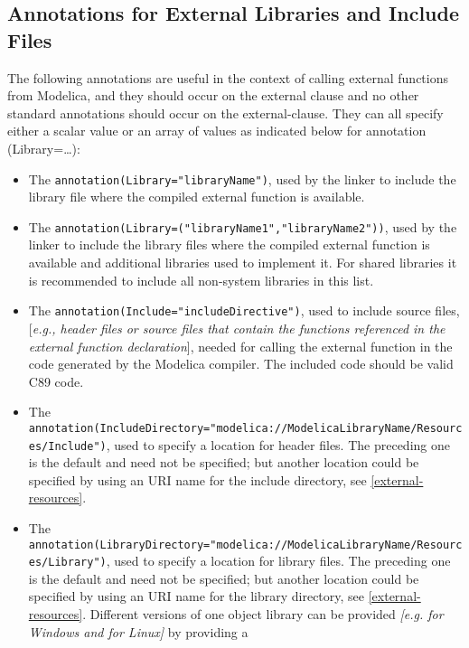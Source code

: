 \subsection{Annotations for External Libraries and Include Files}

The following annotations are useful in the context of calling external
functions from Modelica, and they should occur on the external clause
and no other standard annotations should occur on the external-clause.
They can all specify either a scalar value or an array of values as
indicated below for annotation (Library=\ldots{}):

\begin{itemize}
\item
  The \lstinline!annotation(Library="libraryName")!, used by the linker to include
  the library file where the compiled external function is available.
\item
  The \lstinline!annotation(Library=("libraryName1","libraryName2"))!, used by the
  linker to include the library files where the compiled external
  function is available and additional libraries used to implement it.
  For shared libraries it is recommended to include all non-system
  libraries in this list.
\item
  The \lstinline!annotation(Include="includeDirective")!, used to include source
  files, {[}\emph{e.g., header files or source files that contain the
  functions referenced in the external function declaration}{]}, needed
  for calling the external function in the code generated by the
  Modelica compiler. The included code should be valid C89 code.
\item
  The
  \lstinline!annotation(IncludeDirectory="modelica://ModelicaLibraryName/Resources/Include")!,
  used to specify a location for header files. The preceding one is the
  default and need not be specified; but another location could be
  specified by using an URI name for the include directory, see \autoref{external-resources}.
\item
  The
  \lstinline!annotation(LibraryDirectory="modelica://ModelicaLibraryName/Resources/Library")!,
  used to specify a location for library files. The preceding one is the
  default and need not be specified; but another location could be
  specified by using an URI name for the library directory, see \autoref{external-resources}.
  Different versions of one object library can be provided
  \emph{{[}e.g. for Windows and for Linux{]}} by providing a

\end{itemize}
